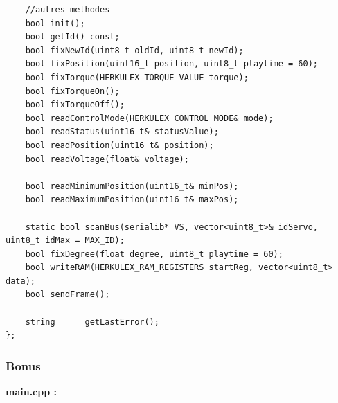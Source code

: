 \documentclass[main.tex]{subfiles}
\begin{document}
\begin{lstlisting}
    //autres methodes
    bool init();
    bool getId() const;
    bool fixNewId(uint8_t oldId, uint8_t newId);
    bool fixPosition(uint16_t position, uint8_t playtime = 60);
    bool fixTorque(HERKULEX_TORQUE_VALUE torque);
    bool fixTorqueOn();
    bool fixTorqueOff();
    bool readControlMode(HERKULEX_CONTROL_MODE& mode);
    bool readStatus(uint16_t& statusValue);
    bool readPosition(uint16_t& position);
    bool readVoltage(float& voltage);

    bool readMinimumPosition(uint16_t& minPos);
    bool readMaximumPosition(uint16_t& maxPos);

    static bool scanBus(serialib* VS, vector<uint8_t>& idServo, uint8_t idMax = MAX_ID);
    bool fixDegree(float degree, uint8_t playtime = 60);
    bool writeRAM(HERKULEX_RAM_REGISTERS startReg, vector<uint8_t> data);
    bool sendFrame();

    string      getLastError();
};
\end{lstlisting}

\subsubsection{Bonus}

\textbf{main.cpp :}
\end{document}
